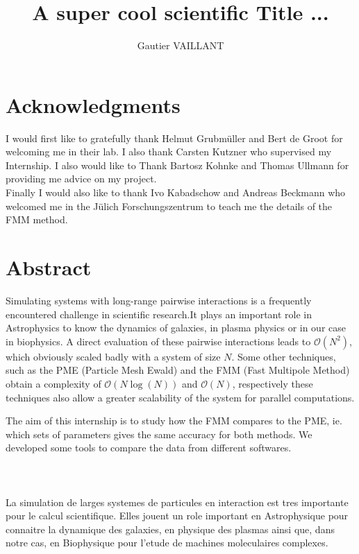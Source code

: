 \documentclass[12pt,twoside,a4paper]{report}
\title{A super cool scientific Title ...}
\author{Gautier VAILLANT}
\begin{document}
\maketitle

\chapter*{Acknowledgments}

I would first like to gratefully thank Helmut Grubmüller and Bert de Groot for welcoming me in their lab. I also thank Carsten Kutzner who supervised my Internship. I also would like to Thank Bartosz Kohnke and Thomas Ullmann for providing me advice on my project.\\ 

Finally I would also like to thank Ivo Kabadschow and Andreas Beckmann who welcomed me in the Jülich Forschungszentrum to teach me the details of the FMM method. 


\chapter*{Abstract}

Simulating systems with long-range pairwise interactions is a frequently encountered challenge in scientific research.It plays an important role in Astrophysics to know the dynamics of galaxies, in plasma physics or in our case in biophysics.  A direct evaluation of these pairwise interactions leads to $\mathcal{O}(N^2)$, which obviously scaled badly with a system of size $N$. 
Some other techniques, such as the PME (Particle Mesh Ewald) and the FMM (Fast Multipole Method) obtain a complexity of $\mathcal{O}(N\log(N))$ and $\mathcal{O}(N)$,  respectively these techniques also allow a greater scalability of the system for parallel computations.

The aim of this internship is to study how the FMM compares to the PME, ie. which sets of parameters gives the same accuracy  for both methods. We developed some tools to compare the data from different softwares. 
\\
\\
\\
\\

	La simulation de larges systemes de particules en interaction est tres importante pour le calcul scientifique. Elles jouent un role important en Astrophysique pour connaitre la dynamique des galaxies, en physique des plasmas ainsi que, dans notre cas, en Biophysique pour l'etude de machines moleculaires complexes.
	
\end{document}
